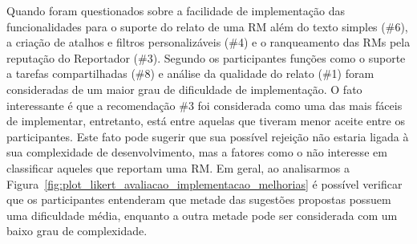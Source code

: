 Quando foram questionados sobre a facilidade de implementação das
funcionalidades para o suporte do relato de uma RM além do texto simples (\#6),
a criação de atalhos e filtros personalizáveis (\#4) e o ranqueamento das RMs
pela reputação do Reportador (\#3). Segundo os participantes funções como o
suporte a tarefas compartilhadas (\#8) e análise da qualidade do relato (\#1)
foram consideradas de um maior grau de dificuldade de implementação. O fato
interessante é que a recomendação \#3 foi considerada como uma das mais fáceis
de implementar, entretanto, está entre aquelas que tiveram menor aceite entre os
participantes.  Este fato pode sugerir que sua possível rejeição não estaria
ligada à sua complexidade de desenvolvimento, mas a fatores como o não interesse
em classificar aqueles que reportam uma RM\@. Em geral, ao analisarmos a
Figura~\ref{fig:plot_likert_avaliacao_implementacao_melhorias} é possível
verificar que os participantes entenderam que metade das sugestões propostas
possuem uma dificuldade média, enquanto a outra metade pode ser considerada com
um baixo grau de complexidade.

\begin{table}[htpb]
\centering
{}
\caption{Ordenamento das sugestões pelo grau de dificuldade.}
\label{tab:ranking_implementacao_sug_melhorias}
\end{table}

